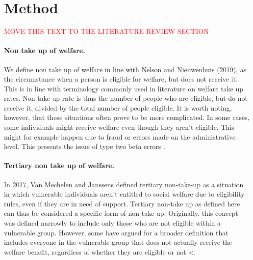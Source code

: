 \section{Method} 

\textcolor{red}{MOVE THIS TEXT TO THE LITERATURE REVIEW SECTION}

\paragraph{Non take up of welfare.}

We define non take up of welfare in line with Nelson and Nieuwenhuis (2019), as the circumstance when a person is eligible for welfare, but does not receive it. This is in line with terminology commonly used in literature on welfare take up rates. Non take up rate is thus the number of people who are eligible, but do not receive it, divided by the total number of people eligible. It is worth noting, however, that these situations often prove to be more complicated. In some cases, some individuals might receive welfare even though they aren’t eligible. This might for example happen due to fraud or errors made on the administrative level. This presents the issue of type two beta errors \citep{herber_non-take-up_2019, nelson_towards_2021}.

\paragraph{Tertiary non take up of welfare.}
In 2017, Van Mechelen and Janssens defined tertiary non-take-up
as a situation in which vulnerable individuals aren’t entitled to social welfare due to eligibility rules, even
if they are in need of support. Tertiary non-take up as defined here can thus be considered a specific
form of non take up. Originally, this concept was defined narrowly to include only those who are not
eligible within a vulnerable group. However, some have argued for a broader definition that includes
everyone in the vulnerable group that does not actually receive the welfare benefit, regardless of whether
they are eligible or not <\citep{mechelen_who_2017, goedeme_concept_2020}.


